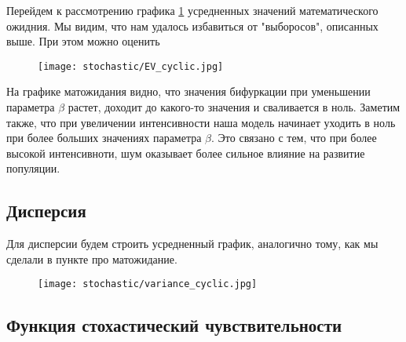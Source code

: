         Перейдем к рассмотрению графика \ref{EV_cyclic} усредненных значений математического ожидния. Мы видим, что нам удалось избавиться от "выборосов", описанных выше. При этом можно оценить 
        
        \begin{figure}
            \centering
            \texttt{[image: stochastic/EV\_cyclic.jpg]}
        
            \captionsetup{justification=centering}
            \caption{}
            \label{EV_cyclic}
        \end{figure}

        На графике матожидания видно, что значения бифуркации при уменьшении параметра \(\beta\) растет, доходит до какого-то значения и сваливается в ноль. Заметим также, что при увеличении интенсивности наша модель начинает уходить в ноль при более больших значениях параметра \(\beta\). Это связано с тем, что при более высокой интенсивноти, шум оказывает более сильное влияние на развитие популяции.





    \subsection{Дисперсия}

        Для дисперсии будем строить усредненный график, аналогично тому, как мы сделали в пункте про матожидание.

        
        \begin{figure}
            \centering
            \texttt{[image: stochastic/variance\_cyclic.jpg]}
        
            \captionsetup{justification=centering}
            \caption{}
            \label{variance_cyclic}
        \end{figure}

    \subsection{Функция стохастический чувствительности}
    
